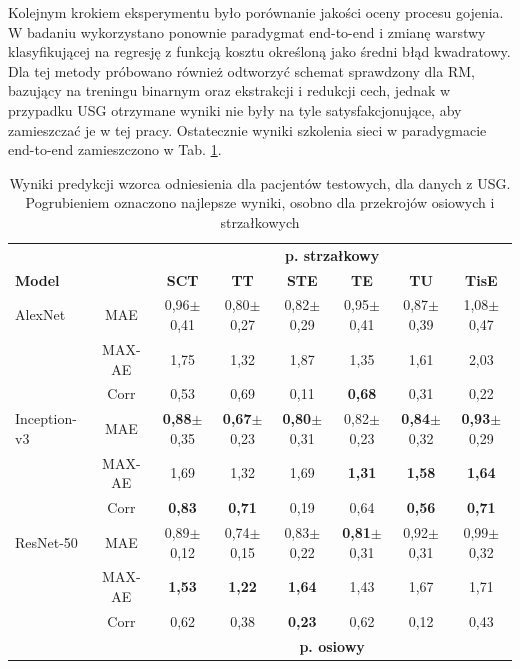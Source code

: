 Kolejnym krokiem eksperymentu było porównanie jakości oceny procesu gojenia. W badaniu wykorzystano ponownie paradygmat end-to-end i zmianę warstwy klasyfikującej na regresję z funkcją kosztu określoną jako średni błąd kwadratowy. Dla tej metody próbowano również odtworzyć schemat sprawdzony dla RM, bazujący na treningu binarnym oraz ekstrakcji i redukcji cech, jednak w przypadku USG otrzymane wyniki nie były na tyle satysfakcjonujące, aby zamieszczać je w tej pracy. Ostatecznie wyniki szkolenia sieci w paradygmacie end-to-end zamieszczono w Tab. \ref{tab:usg_train_cross-validation}.
\renewcommand{\arraystretch}{1.2}
\begin{table}[h]
	\scriptsize
	\setlength{\tabcolsep}{3pt}
	\centering
	\caption{Wyniki predykcji wzorca odniesienia dla pacjentów testowych, dla danych z USG. Pogrubieniem oznaczono najlepsze wyniki, osobno dla przekrojów osiowych i strzałkowych}
	\label{tab:usg_train_cross-validation}
	\begin{tabular}{lc||c|c|c|c|c|c}
		& & \multicolumn{6}{c}{\textbf{p. strzałkowy}} \\
		\textbf{Model} & & \textbf{SCT} & \textbf{TT} & \textbf{STE} & \textbf{TE} & \textbf{TU} & \textbf{TisE} \\ \hline \hline
		AlexNet & MAE & 0,96$\pm$0,41 & 0,80$\pm$0,27 & 0,82$\pm$0,29 & 0,95$\pm$0,41 & 0,87$\pm$0,39 & 1,08$\pm$0,47  \\
		& MAX-AE & 1,75 & 1,32 & 1,87 & 1,35 & 1,61 & 2,03 \\ 
		& Corr & 0,53 & 0,69 & 0,11 & \textbf{0,68} & 0,31 & 0,22 \\ \hline
		Inception-v3 & MAE & \textbf{0,88}$\pm$0,35 & \textbf{0,67}$\pm$0,23 & \textbf{0,80}$\pm$0,31 & 0,82$\pm$0,23 & \textbf{0,84}$\pm$0,32 & \textbf{0,93}$\pm$0,29  \\
		& MAX-AE & 1,69 & 1,32 & 1,69 & \textbf{1,31} & \textbf{1,58} & \textbf{1,64} \\ 
		& Corr & \textbf{0,83} & \textbf{0,71} & 0,19 & 0,64 & \textbf{0,56} & \textbf{0,71} \\ \hline
		ResNet-50 & MAE & 0,89$\pm$0,12 & 0,74$\pm$0,15 & 0,83$\pm$0,22 & \textbf{0,81}$\pm$0,31 & 0,92$\pm$0,31 & 0,99$\pm$0,32 \\
		& MAX-AE & \textbf{1,53} & \textbf{1,22} & \textbf{1,64} & 1,43 & 1,67 & 1,71 \\
		& Corr & 0,62 & 0,38 & \textbf{0,23} & 0,62 & 0,12 & 0,43 \\ \hline \hline
		& & \multicolumn{6}{c}{\textbf{p. osiowy}} \\
		

\end{tabular}
\end{table}
